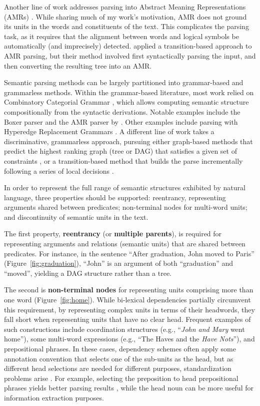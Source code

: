 \documentclass[12pt,a4paper]{report}
\begin{document}
Another line of work addresses parsing into Abstract Meaning Representations (AMRs)
\citep{banarescu2013abstract,flanigan2014discriminative,vanderwende2015amr,pust2015parsing,artzi2015broad}. 
While sharing much of my work's motivation,
AMR does not ground its units in the words and constituents of the text.
This complicates the parsing task, as it requires
that the alignment between words and logical symbols be automatically
(and imprecisely) detected.
\cite{wang2015transition} applied a transition-based approach to AMR parsing,
but their method involved first syntactically parsing the input, and then converting
the resulting tree into an AMR.

Semantic parsing methods can be largely partitioned into grammar-based and grammarless methods.
Within the grammar-based literature, most work relied on Combinatory Categorial Grammar
\citep[CCG]{Steedman:00}, which allows computing semantic structure compositionally from the
syntactic derivations. Notable examples include the Boxer parser \citep{bos2005towards}
and the AMR parser by \citep{artzi2015broad}.
Other examples include parsing with Hyperedge Replacement Grammars
\citep{jones2012semantics}.
A different line of work takes a discriminative, grammarless approach,
pursuing either graph-based methods that predict the highest ranking graph
(tree or DAG) that satisfies a given set of constraints
\citep[for AMR parsing]{flanigan2014discriminative},
or a transition-based method
that builds the parse incrementally following a series of local
decisions \citep{Nivre03anefficient}.

In order to represent the full range of semantic structures exhibited by
natural language, three properties should be supported: reentrancy,
representing arguments shared between predicates;
non-terminal nodes for multi-word units;
and discontinuity of semantic units in the text.

The first property, \textbf{reentrancy} (or \textbf{multiple parents}), is required for
representing arguments and relations (semantic units) that are shared between predicates.
For instance, in the sentence
``After graduation, John moved to Paris'' (Figure~\ref{fig:graduation}),
``John'' is an argument of both ``graduation''
and ``moved'', yielding a DAG structure rather than a tree.

The second is \textbf{non-terminal nodes} for representing units
comprising more than one word (Figure~\ref{fig:home}).
While bi-lexical dependencies partially circumvent this requirement, by
representing complex units in terms of their headwords, they fall short
when representing units that have no clear head.
Frequent examples of such constructions include
coordination structures (e.g., ``\textit{John and Mary} went home''),
some multi-word expressions (e.g., ``The Haves and the \textit{Have Nots}''),
and prepositional phrases.
In these cases, dependency schemes often apply some annotation convention that
selects one of the sub-units
as the head, but as different head selections are needed for different purposes,
standardization problems arise \citep{Ivanova2012who}.
For example, selecting the preposition to head prepositional phrases yields better
parsing results \citep{Schwartz:12}, while the head noun can be more useful for
information extraction purposes.
\end{document}
